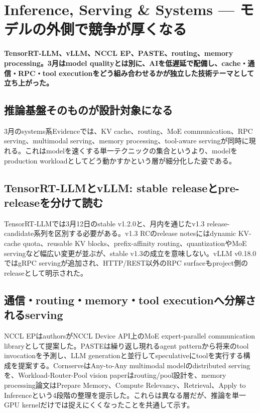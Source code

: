 \section{Inference, Serving \& Systems — モデルの外側で競争が厚くなる}
\label{pkg:inference-serving-systems-march}
\noindent\textbf{TensorRT-LLM、vLLM、NCCL EP、PASTE、routing、memory processing。3月はmodel qualityとは別に、AIを低遅延で配備し、cache・通信・RPC・tool executionをどう組み合わせるかが独立した技術テーマとして立ち上がった。}\autocite{src-3802d01433c1,src-446e2c561111,src-7e670bf82538,src-d6cda62f02bb,src-fc697f165940}

\subsection{推論基盤そのものが設計対象になる}

3月のsystems系Evidenceでは、KV cache、routing、MoE communication、RPC serving、multimodal serving、memory processing、tool-aware servingが同時に現れる。これはmodelを速くする単一テクニックの集合というより、modelをproduction workloadとしてどう動かすかという層が細分化した姿である。\autocite{src-361b6111931d,src-3802d01433c1,src-446e2c561111,src-795aff00bd48,src-7e670bf82538,src-b08e40540c2a,src-b6e517afaa35,src-d6cda62f02bb,src-fc697f165940}


\subsection{TensorRT-LLMとvLLM: stable releaseとpre-releaseを分けて読む}

TensorRT-LLMでは3月12日のstable v1.2.0と、月内を通じたv1.3 release-candidate系列を区別する必要がある。v1.3 RCのrelease notesにはdynamic KV-cache quota、reusable KV blocks、prefix-affinity routing、quantizationやMoE servingなど幅広い変更が並ぶが、stable v1.3の成立を意味しない。vLLM v0.18.0ではgRPC servingが追加され、HTTP/REST以外のRPC surfaceもproject側のreleaseとして明示された。\autocite{src-7e670bf82538,src-b08e40540c2a,src-d6cda62f02bb,src-fc697f165940}


\subsection{通信・routing・memory・tool executionへ分解されるserving}

NCCL EPはauthorsがNCCL Device API上のMoE expert-parallel communication libraryとして提案した。PASTEは繰り返し現れるagent patternから将来のtool invocationを予測し、LLM generationと並行してspeculativeにtoolを実行する構成を提案する。CornserveはAny-to-Any multimodal modelのdistributed servingを、Workload-Router-Pool vision paperはrouting/pool設計を、memory processing論文はPrepare Memory、Compute Relevancy、Retrieval、Apply to Inferenceという4段階の整理を提示した。これらは異なる層だが、推論を単一GPU kernelだけでは捉えにくくなったことを共通して示す。\autocite{src-361b6111931d,src-3802d01433c1,src-446e2c561111,src-795aff00bd48,src-b6e517afaa35}


